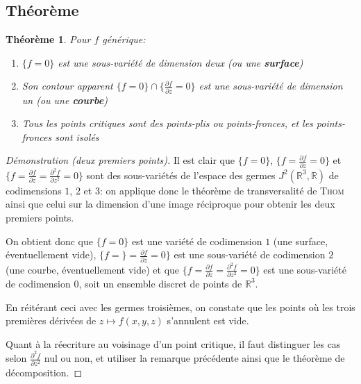 \documentclass[a4paper]{article}
\newcommand{\R}{\mathbb{R}}
\newtheorem{thm}{Théorème}
\theoremstyle{definition}
\begin{document}
\subsection{Théorème}
\setcounter{thm}{6}
\begin{thm}
	Pour $f$ générique:
	\begin{enumerate}
		\item $\{f=0\}$ est une sous-variété de dimension deux (ou une \textbf{surface})
		\item Son contour apparent $\{f=0\}\cap \{\frac{\partial f}{\partial z}=0\}$ est une sous-variété de dimension un (ou une \textbf{courbe})
		\item Tous les points critiques sont des points-plis ou points-fronces, et les points-fronces sont isolés
	\end{enumerate}
\end{thm}
\begin{proof}[Démonstration (deux premiers points)]
	Il est clair que $\{f=0\}$, $\{f=\frac{\partial f}{\partial z}=0\}$ et $\{f=\frac{\partial f}{\partial z}=\frac{\partial^2 f}{\partial z^2}=0\}$ sont des sous-variétés de l'espace des germes $J^2(\R^3,\R)$ de codimensions $1$, $2$ et $3$: on applique donc le théorème de transversalité de \textsc{Thom} ainsi que celui sur la dimension d'une image réciproque pour obtenir les deux premiers points.

	On obtient donc que $\{f=0\}$ est une variété de codimension $1$ (une surface, éventuellement vide), $\{f=\}=\frac{\partial f}{\partial z}=0\}$ est une sous-variété de codimension $2$ (une courbe, éventuellement vide) et que $\{f=\frac{\partial f}{\partial z}=\frac{\partial^2 f}{\partial z^2}=0\}$ est une sous-variété de codimension $0$, soit un ensemble discret de points de $\R^3$.

	En réitérant ceci avec les germes troisièmes, on constate que les points où les trois premières dérivées de $z \mapsto f(x,y,z)$ s'annulent est vide.

	Quant à la réecriture au voisinage d'un point critique, il faut distinguer les cas selon $\frac{\partial^2 f}{\partial z^2}$ nul ou non, et utiliser la remarque précédente ainsi que le théorème de décomposition.
\end{proof}
\end{document}
